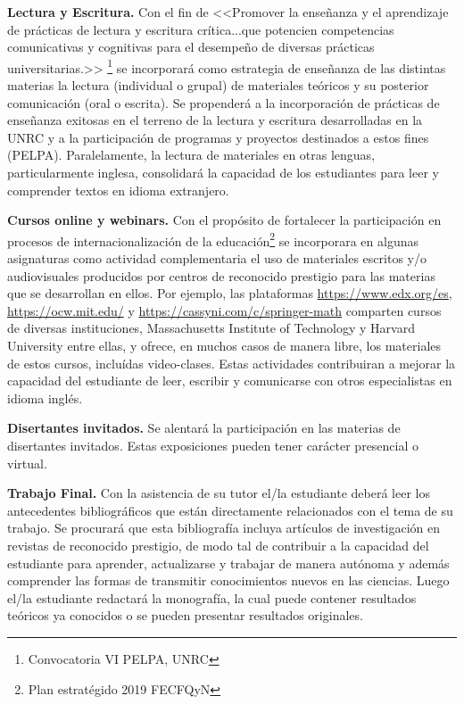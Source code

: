\documentclass[a4paper, 12pt]{article}
\begin{document}
\begin{description}
\item{\textbf{Lectura y Escritura.}} Con el fin de <<Promover la enseñanza y el aprendizaje de prácticas de lectura y escritura crítica...que potencien competencias comunicativas y cognitivas para el desempeño de diversas prácticas universitarias.>> \footnote{Convocatoria VI PELPA, UNRC}  se incorporará  como estrategia de enseñanza de las distintas  materias la lectura (individual o grupal) de materiales teóricos y su posterior comunicación (oral o escrita). Se propenderá a la incorporación  de prácticas de enseñanza exitosas en el terreno de la lectura y escritura desarrolladas en la UNRC \cite{roldan2022} y a la participación de programas y proyectos destinados a estos fines (PELPA).  Paralelamente, la lectura de materiales en otras lenguas, particularmente inglesa, consolidará la capacidad de los estudiantes para leer y comprender textos en idioma extranjero.  


\item{\textbf{Cursos online y webinars.}} Con el propósito de fortalecer  la participación en procesos de internacionalización de la educación\footnote{Plan estratégido 2019 FECFQyN}  se  incorporara en algunas asignaturas como actividad complementaria el uso de materiales escritos y/o audiovisuales producidos por centros de reconocido prestigio para las materias que se desarrollan en ellos. Por ejemplo, las plataformas \href{https://www.edx.org/es}{https://www.edx.org/es}, \href{https://ocw.mit.edu/}{https://ocw.mit.edu/} y  \href{https://cassyni.com/c/springer-math}{https://cassyni.com/c/springer-math} comparten cursos de diversas instituciones, Massachusetts Institute of Technology y Harvard University entre ellas, y ofrece, en muchos casos de manera libre, los materiales de estos cursos, incluídas video-clases. Estas actividades contribuiran a mejorar la capacidad del estudiante de leer, escribir y comunicarse con
otros especialistas en idioma inglés. 


\item{\textbf{Disertantes invitados.}} Se alentará la participación en las materias de disertantes invitados. Estas exposiciones pueden tener carácter presencial o virtual.   

\item{\textbf{Trabajo Final.}}   Con la asistencia de su tutor el/la estudiante deberá leer los antecedentes bibliográficos que están directamente relacionados con el tema de su trabajo. Se procurará que esta bibliografía incluya artículos de investigación en revistas de reconocido prestigio, de modo tal de contribuir a la capacidad del estudiante para aprender, actualizarse y trabajar de manera autónoma y además  comprender las formas de transmitir conocimientos nuevos en las ciencias. Luego el/la estudiante  redactará la monografía, la cual puede contener resultados teóricos ya conocidos o se pueden presentar resultados originales.

\end{description}
\end{document}

